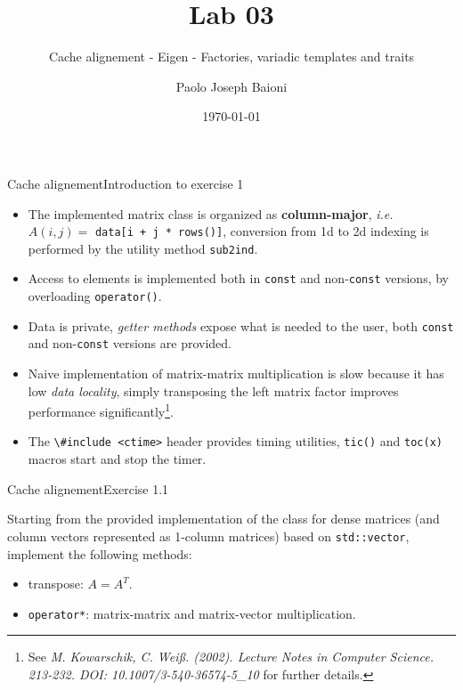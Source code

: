 \documentclass[10pt]{beamer}
\begin{document}
    \title{Lab 03} \subtitle{Cache alignement - Eigen - Factories, variadic templates and traits}
    \author{Paolo Joseph Baioni}
    \date{\today}

\begin{frame}
    \maketitle
\end{frame}

\begin{frame}{Cache alignement}{Introduction to exercise 1}
\begin{itemize}
\item The implemented matrix class is organized as
      \textbf{column-major}, \textit{i.e.}
      $A(i, j) = $ \lstinline{data[i + j * rows()]}, 
      conversion from 1d to 2d indexing is performed by the utility
      method \lstinline{sub2ind}.\\[3mm]
\item Access to elements is implemented both in \texttt{const} and non-\texttt{const} versions, by overloading \lstinline{operator()}. \\[3mm]
\item Data is private, \textit{getter methods} expose what is needed to the user, both \texttt{const} and non-\texttt{const} versions are provided. \\[3mm]
\item Naive implementation of matrix-matrix multiplication is slow because it has low \textit{data locality}, simply transposing the left matrix factor improves performance significantly\footnote{See \textit{M. Kowarschik, C. Weiß. (2002). Lecture Notes in Computer Science. 213-232. DOI: 10.1007/3-540-36574-5\_10} for further details.}.\\[3mm]
\item The \lstinline{\#include <ctime>} header provides timing utilities, \lstinline{tic()} and \lstinline{toc(x)} macros start and stop the timer.
\end{itemize}
\end{frame}

\begin{frame}{Cache alignement}{Exercise 1.1}

Starting from the provided implementation of the class for dense matrices (and column vectors represented as 1-column matrices) based on \lstinline{std::vector}, implement the following methods:
\begin{itemize}
\item transpose: $A = A^{T}$.
\item \lstinline{operator*}: matrix-matrix and matrix-vector multiplication.
\end{itemize}
\end{frame}
\end{document}
